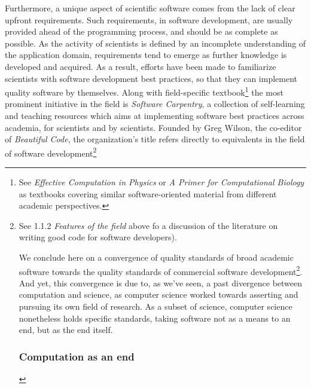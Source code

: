 Furthermore, a unique aspect of scientific software comes from the lack of clear upfront requirements. Such requirements, in software development, are usually provided ahead of the programming process, and should be as complete as possible. As the activity of scientists is defined by an incomplete understanding of the application domain, requirements tend to emerge as further knowledge is developed and acquired\cite{segal_when_2005}. As a result, efforts have been made to familiarize scientists with software development best practices, so that they can implement quality software by themselves. Along with field-specific textbook\footnote{See \emph{Effective Computation in Physics}\cite{scopatz_effective_2015} or \emph{A Primer for Computational Biology}\cite{oneil_primer_2019} as textbooks covering similar software-oriented material from different academic perspectives.} the most prominent initiative in the field is \emph{Software Carpentry}, a collection of self-learning and teaching resources which aims at implementing software best practices across academia, for scientists and by scientists. Founded by Greg Wilson, the co-editor of \emph{Beautiful Code}, the organization's title refers directly to equivalents in the field of software development\footnote{See 1.1.2 \emph{Features of the field} above fo a discussion of the literature on writing good code for software developers).

We conclude here on a convergence of quality standards of broad academic software towards the quality standards of commercial software development\footnote{See Graphbrain at \url{https://github.com/graphbrain/graphbrain} for such an example. The code's organization and formal features are congruent and on par with commercial software.}.  And yet, this convergence is due to, as we've seen, a past divergence between computation and science, as computer science worked towards asserting and pursuing its own field of research. As a subset of science, computer science nonetheless holds specific standards, taking software not as a means to an end, but as the end itself.

\vspace*{1\baselineskip}

\subsubsection{Computation as an end}

}
